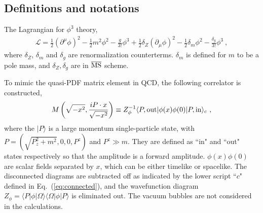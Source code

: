 \documentclass[a4paper,11pt]{article}
\begin{document}
\subsection{Definitions and notations}
The Lagrangian for $\phi^3$ theory,
\begin{align}
\mathcal{L} = \frac{1}{2} (\partial^{\mu} \phi)^2 - \frac{1}{2} m^2 \phi^2 - \frac{g}{3!} \phi^3 + \frac{1}{2} \delta_Z (\partial_\mu \phi)^2 - \frac{1}{2} \delta_m \phi^2 - \frac{\delta_g}{3!} \phi^3 \ ,
\end{align}
where $\delta_Z$, $\delta_m$ and $\delta_g$ are renormalization counterterms. $\delta_m$ is defined for $m$ to be a pole mass, and $\delta_Z, \delta_g$ are in $\overline{\rm MS}$ scheme. 

To mimic the quasi-PDF matrix element in QCD, the following correlator is constructed,
\begin{align}\label{eq:Mdefphi3}
M\left(\sqrt{-x^2}, \frac{i P\cdot x}{\sqrt{-x^2}}\right) \equiv Z^{-1}_{\phi} \langle P, {\rm out} |  \phi(x) \phi(0)  | P, {\rm in} \rangle_c \ ,
\end{align}
where the $| P \rangle$ is a large momentum single-particle state, with $P=(\sqrt{P_z^2+m^2},0,0,P^z)$ and $P^z \gg m$. They are defined as ``in" and ``out" states respectively so that the amplitude is a forward amplitude. $\phi(x) \phi(0)$ are scalar fields separated by $x$, which can be either timelike or spacelike. The disconnected diagrams are subtracted off as indicated by the lower script ``$c$" defined in Eq.~(\ref{eq:connected}), and the wavefunction diagram $Z_{\phi} = \langle P | \phi |\Omega \rangle \langle \Omega | \phi  | P \rangle$ is eliminated out. The vacuum bubbles are not considered in the calculations.
\end{document}
